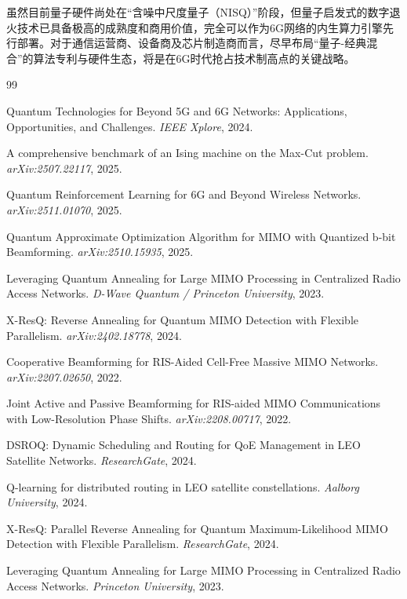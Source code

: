 \documentclass[12pt,a4paper]{article}
\begin{document}
虽然目前量子硬件尚处在``含噪中尺度量子（NISQ）''阶段，但量子启发式的数字退火技术已具备极高的成熟度和商用价值，完全可以作为6G网络的内生算力引擎先行部署。对于通信运营商、设备商及芯片制造商而言，尽早布局``量子-经典混合''的算法专利与硬件生态，将是在6G时代抢占技术制高点的关键战略。


\begin{thebibliography}{99}

Quantum Technologies for Beyond 5G and 6G Networks: Applications, Opportunities, and Challenges.
\textit{IEEE Xplore}, 2024.

A comprehensive benchmark of an Ising machine on the Max-Cut problem.
\textit{arXiv:2507.22117}, 2025.

Quantum Reinforcement Learning for 6G and Beyond Wireless Networks.
\textit{arXiv:2511.01070}, 2025.

Quantum Approximate Optimization Algorithm for MIMO with Quantized b-bit Beamforming.
\textit{arXiv:2510.15935}, 2025.

Leveraging Quantum Annealing for Large MIMO Processing in Centralized Radio Access Networks.
\textit{D-Wave Quantum / Princeton University}, 2023.

X-ResQ: Reverse Annealing for Quantum MIMO Detection with Flexible Parallelism.
\textit{arXiv:2402.18778}, 2024.

Cooperative Beamforming for RIS-Aided Cell-Free Massive MIMO Networks.
\textit{arXiv:2207.02650}, 2022.

Joint Active and Passive Beamforming for RIS-aided MIMO Communications with Low-Resolution Phase Shifts.
\textit{arXiv:2208.00717}, 2022.

DSROQ: Dynamic Scheduling and Routing for QoE Management in LEO Satellite Networks.
\textit{ResearchGate}, 2024.

Q-learning for distributed routing in LEO satellite constellations.
\textit{Aalborg University}, 2024.

X-ResQ: Parallel Reverse Annealing for Quantum Maximum-Likelihood MIMO Detection with Flexible Parallelism.
\textit{ResearchGate}, 2024.

Leveraging Quantum Annealing for Large MIMO Processing in Centralized Radio Access Networks.
\textit{Princeton University}, 2023.


\end{thebibliography}
\end{document}
